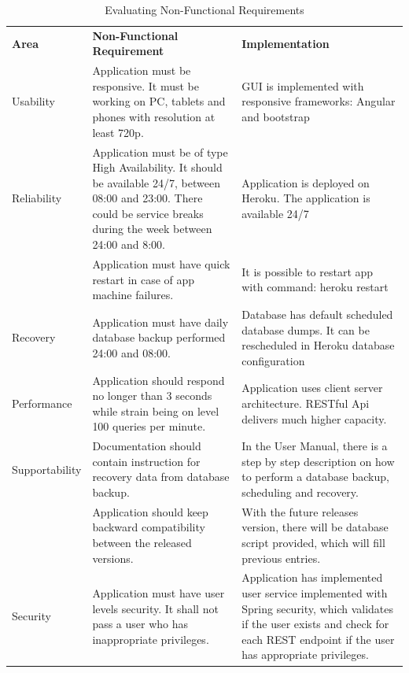 \documentclass[a4paper,11pt,twoside]{report}
\theoremstyle{definition}
\begin{document}
\begin{longtable}{|p{3cm}|p{7cm}|p{6cm}|}
\caption[Evaluating Non-Functional Requirements]{Evaluating Non-Functional Requirements}
\label{Evaluating Non-Functional Requirements}
\centering
\tabularnewline

\hline
\textbf{Area} & \textbf{Non-Functional Requirement} & \textbf{Implementation} \\ \hline
Usability & Application must be responsive. It must be working on PC, tablets and phones with resolution at least 720p. & GUI is implemented with responsive frameworks: Angular and bootstrap \\ \hline
Reliability & Application must be of type High Availability. It should be available
24/7, between 08:00 and 23:00. There could be service breaks during the week between 24:00 and 8:00. & Application is deployed on Heroku. The application is available 24/7 \\ \cline{2-3}
& Application must have quick restart in case of app machine failures. & It is possible to restart app with command: heroku restart \\ \hline
Recovery & Application must have daily database backup performed 24:00 and 08:00. & 
Database has default scheduled database dumps. It can be rescheduled in Heroku database configuration \\ \hline
Performance & Application should respond no longer than 3 seconds while strain being on level 100 queries per minute. & Application uses client server architecture. RESTful Api delivers much higher capacity. \\ \hline
Supportability & Documentation should contain instruction for recovery data from
database backup. & In the User Manual, there is a step by step description on how to perform a database backup, scheduling  and recovery. \\ \cline{2-3}
& Application should keep backward compatibility between the released versions. & With the future releases version, there will be database script provided, which will fill previous entries. \\ \hline
Security & Application must have user levels security. It shall not pass a user who has inappropriate privileges. & Application has implemented user service implemented with Spring security, which validates if the user exists and check for each REST endpoint if the user has appropriate privileges. \\ \hline

\end{longtable}
\end{document}
